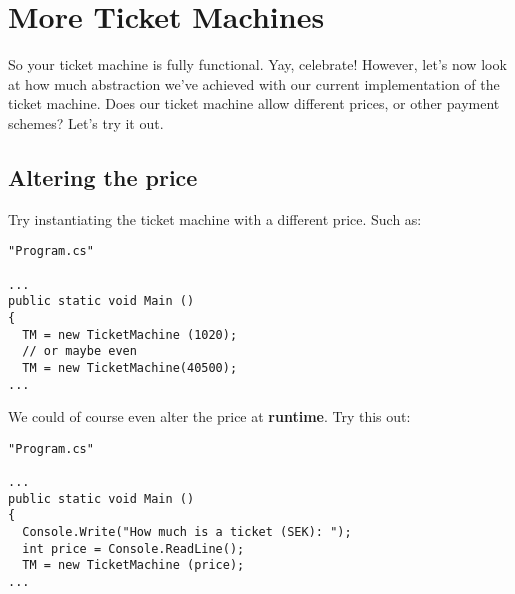 \documentclass{article}
\begin{document}
\pagebreak
\section{More Ticket Machines}
So your ticket machine is fully functional. Yay, celebrate! However, let’s now look at how much abstraction we’ve achieved with our current implementation of the ticket machine. Does our ticket machine allow different prices, or other payment schemes? Let’s try it out.
\subsection{Altering the price}
Try instantiating the ticket machine with a different price. Such as:
\begin{lstlisting}
"Program.cs"

...
public static void Main ()
{ 
  TM = new TicketMachine (1020);
  // or maybe even
  TM = new TicketMachine(40500);
...
\end{lstlisting}
We could of course even alter the price at \textbf{runtime}. Try this out:
\begin{lstlisting}
"Program.cs"

...
public static void Main ()
{ 
  Console.Write("How much is a ticket (SEK): ");
  int price = Console.ReadLine();
  TM = new TicketMachine (price);
...
\end{lstlisting}
\end{document}
